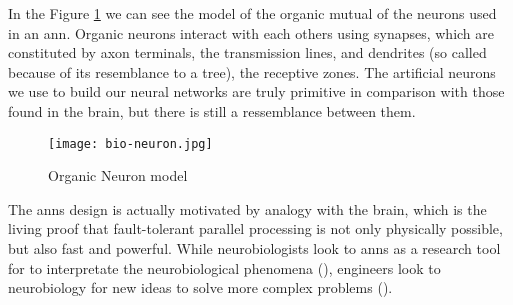 In the Figure \ref{fig:org_neuron} we can see the model of the organic mutual of the neurons used in an \gls{ann}. Organic neurons interact with each others using synapses, which are constituted by axon terminals, the transmission lines, and dendrites (so called because of its resemblance to a tree), the receptive zones. The artificial neurons we use to build our neural networks are truly primitive in comparison with those found in the brain, but there is still a ressemblance between them.

\begin{figure}[!ht]
	\centering
	\texttt{[image: bio-neuron.jpg]}
	\caption{Organic Neuron model}
	\label{fig:org_neuron}
\end{figure}

The \glspl{ann} design is actually motivated by analogy with the brain, which is the living proof that fault-tolerant parallel processing is not only physically possible, but also fast and powerful. While neurobiologists look to \glspl{ann} as a research tool for to interpretate the neurobiological phenomena (\cite{anastasio1993}), engineers look to neurobiology for new ideas to solve more complex problems (\cite{mead1989}).





